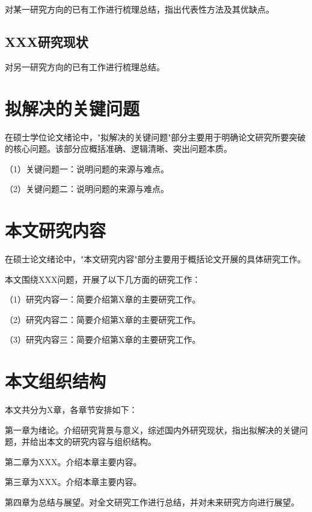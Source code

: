 对某一研究方向的已有工作进行梳理总结，指出代表性方法及其优缺点\cite{example1}。

\subsection{XXX研究现状}

对另一研究方向的已有工作进行梳理总结\cite{example2}。

\section{拟解决的关键问题}

在硕士学位论文绪论中，"拟解决的关键问题"部分主要用于明确论文研究所要突破的核心问题。该部分应概括准确、逻辑清晰、突出问题本质。

（1）关键问题一：说明问题的来源与难点。

（2）关键问题二：说明问题的来源与难点。

\section{本文研究内容}

在硕士论文绪论中，"本文研究内容"部分主要用于概括论文开展的具体研究工作。

本文围绕XXX问题，开展了以下几方面的研究工作：

（1）研究内容一：简要介绍第X章的主要研究工作。

（2）研究内容二：简要介绍第X章的主要研究工作。

（3）研究内容三：简要介绍第X章的主要研究工作。

\section{本文组织结构}

本文共分为X章，各章节安排如下：

第一章为绪论。介绍研究背景与意义，综述国内外研究现状，指出拟解决的关键问题，并给出本文的研究内容与组织结构。

第二章为XXX。介绍本章主要内容。

第三章为XXX。介绍本章主要内容。

第四章为总结与展望。对全文研究工作进行总结，并对未来研究方向进行展望。

